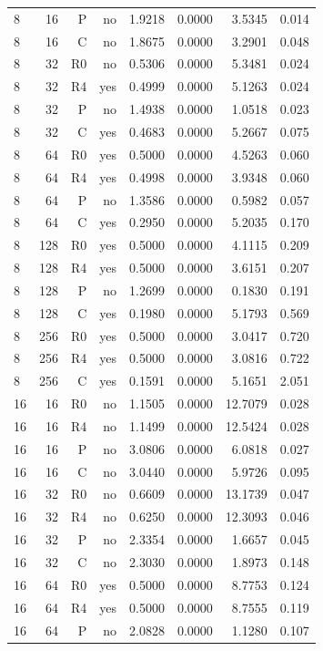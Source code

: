 {\begin{longtable}{lrrrrrrr}
8 & 16 & P & no & 1.9218 & 0.0000 & 3.5345 & 0.014 \\
8 & 16 & C & no & 1.8675 & 0.0000 & 3.2901 & 0.048 \\
8 & 32 & R0 & no & 0.5306 & 0.0000 & 5.3481 & 0.024 \\
8 & 32 & R4 & yes & 0.4999 & 0.0000 & 5.1263 & 0.024 \\
8 & 32 & P & no & 1.4938 & 0.0000 & 1.0518 & 0.023 \\
8 & 32 & C & yes & 0.4683 & 0.0000 & 5.2667 & 0.075 \\
8 & 64 & R0 & yes & 0.5000 & 0.0000 & 4.5263 & 0.060 \\
8 & 64 & R4 & yes & 0.4998 & 0.0000 & 3.9348 & 0.060 \\
8 & 64 & P & no & 1.3586 & 0.0000 & 0.5982 & 0.057 \\
8 & 64 & C & yes & 0.2950 & 0.0000 & 5.2035 & 0.170 \\
8 & 128 & R0 & yes & 0.5000 & 0.0000 & 4.1115 & 0.209 \\
8 & 128 & R4 & yes & 0.5000 & 0.0000 & 3.6151 & 0.207 \\
8 & 128 & P & no & 1.2699 & 0.0000 & 0.1830 & 0.191 \\
8 & 128 & C & yes & 0.1980 & 0.0000 & 5.1793 & 0.569 \\
8 & 256 & R0 & yes & 0.5000 & 0.0000 & 3.0417 & 0.720 \\
8 & 256 & R4 & yes & 0.5000 & 0.0000 & 3.0816 & 0.722 \\
8 & 256 & C & yes & 0.1591 & 0.0000 & 5.1651 & 2.051 \\
16 & 16 & R0 & no & 1.1505 & 0.0000 & 12.7079 & 0.028 \\
16 & 16 & R4 & no & 1.1499 & 0.0000 & 12.5424 & 0.028 \\
16 & 16 & P & no & 3.0806 & 0.0000 & 6.0818 & 0.027 \\
16 & 16 & C & no & 3.0440 & 0.0000 & 5.9726 & 0.095 \\
16 & 32 & R0 & no & 0.6609 & 0.0000 & 13.1739 & 0.047 \\
16 & 32 & R4 & no & 0.6250 & 0.0000 & 12.3093 & 0.046 \\
16 & 32 & P & no & 2.3354 & 0.0000 & 1.6657 & 0.045 \\
16 & 32 & C & no & 2.3030 & 0.0000 & 1.8973 & 0.148 \\
16 & 64 & R0 & yes & 0.5000 & 0.0000 & 8.7753 & 0.124 \\
16 & 64 & R4 & yes & 0.5000 & 0.0000 & 8.7555 & 0.119 \\
16 & 64 & P & no & 2.0828 & 0.0000 & 1.1280 & 0.107 \\

\end{longtable}}
